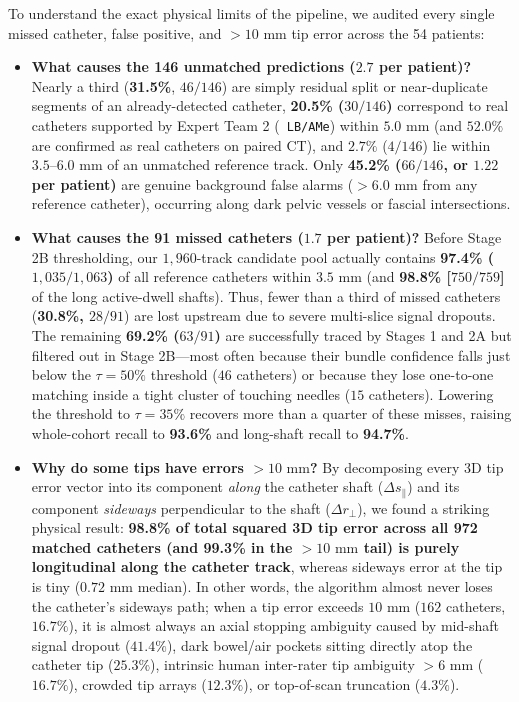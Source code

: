 \documentclass[
  11pt,
]{article}
\providecommand{\tightlist}{%
  \setlength{\itemsep}{0pt}\setlength{\parskip}{0pt}}
\let\nforigtexttt\texttt
\renewcommand{\texttt}[1]{\nforigtexttt{\XeTeXinterchartokenstate=1 #1}}
\begin{document}
To understand the exact physical limits of the pipeline, we audited
every single missed catheter, false positive, and \(>10\text{ mm}\) tip
error across the 54 patients:

\begin{itemize}
\tightlist
\item
  \textbf{What causes the 146 unmatched predictions (\(2.7\) per
  patient)?} Nearly a third (\textbf{31.5\%}, \(46/146\)) are simply
  residual split or near-duplicate segments of an already-detected
  catheter, \textbf{20.5\% (\(30/146\))} correspond to real catheters
  supported by Expert Team 2 (\texttt{LB/AMe}) within \(5.0\text{ mm}\)
  (and \(52.0\%\) are confirmed as real catheters on paired CT), and
  \(2.7\%\) (\(4/146\)) lie within \(3.5\text{--}6.0\text{ mm}\) of an
  unmatched reference track. Only \textbf{45.2\% (\(66/146\), or
  \(1.22\) per patient)} are genuine background false alarms
  (\(>6.0\text{ mm}\) from any reference catheter), occurring along dark
  pelvic vessels or fascial intersections.
\item
  \textbf{What causes the 91 missed catheters (\(1.7\) per patient)?}
  Before Stage 2B thresholding, our \(1,960\)-track candidate pool
  actually contains \textbf{97.4\% (\(1,035/1,063\))} of all reference
  catheters within \(3.5\text{ mm}\) (and \textbf{98.8\%
  {[}\(750/759\){]}} of the long active-dwell shafts). Thus, fewer than
  a third of missed catheters (\textbf{30.8\%, \(28/91\)}) are lost
  upstream due to severe multi-slice signal dropouts. The remaining
  \textbf{69.2\% (\(63/91\))} are successfully traced by Stages 1 and 2A
  but filtered out in Stage 2B---most often because their bundle
  confidence falls just below the \(\tau = 50\%\) threshold (\(46\)
  catheters) or because they lose one-to-one matching inside a tight
  cluster of touching needles (\(15\) catheters). Lowering the threshold
  to \(\tau = 35\%\) recovers more than a quarter of these misses,
  raising whole-cohort recall to \textbf{93.6\%} and long-shaft recall
  to \textbf{94.7\%}.
\item
  \textbf{Why do some tips have errors \(> 10\text{ mm}\)?} By
  decomposing every 3D tip error vector into its component \emph{along}
  the catheter shaft (\(\Delta s_\parallel\)) and its component
  \emph{sideways} perpendicular to the shaft (\(\Delta r_\perp\)), we
  found a striking physical result: \textbf{98.8\% of total squared 3D
  tip error across all 972 matched catheters (and 99.3\% in the
  \(>10\text{ mm}\) tail) is purely longitudinal along the catheter
  track}, whereas sideways error at the tip is tiny (\(0.72\text{ mm}\)
  median). In other words, the algorithm almost never loses the
  catheter's sideways path; when a tip error exceeds \(10\text{ mm}\)
  (\(162\) catheters, \(16.7\%\)), it is almost always an axial stopping
  ambiguity caused by mid-shaft signal dropout (\(41.4\%\)), dark
  bowel/air pockets sitting directly atop the catheter tip (\(25.3\%\)),
  intrinsic human inter-rater tip ambiguity \(>6\text{ mm}\)
  (\(16.7\%\)), crowded tip arrays (\(12.3\%\)), or top-of-scan
  truncation (\(4.3\%\)).
\end{itemize}
\end{document}
